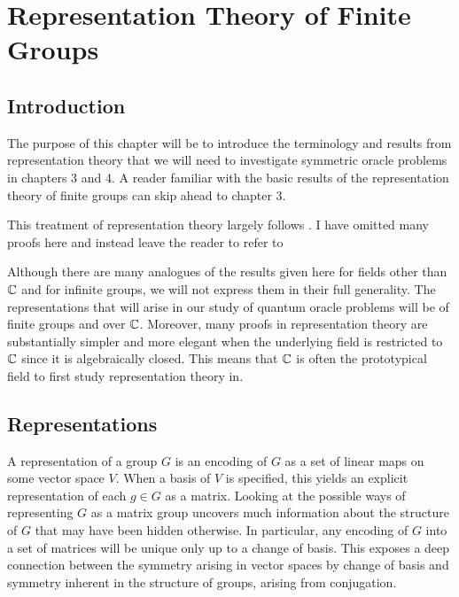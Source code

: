 
\chapter{Representation Theory of Finite Groups}

\section{Introduction}



The purpose of this chapter will be to introduce the terminology and results from representation theory that we 
will need to investigate symmetric oracle problems in chapters 3 and 4. A reader familiar with the basic results of 
the representation theory of finite groups can skip ahead to chapter 3. 

This treatment of representation theory largely follows \cite{James&Liebeck}. I have omitted many proofs here and 
instead leave the reader to refer to \cite{James&Liebeck}

Although there are many analogues of the results given here for fields other than $\mathbb{C}$ and for infinite groups, we 
will not express them in their full generality. The representations that will arise in our study of quantum oracle 
problems will be of finite groups and over $\mathbb{C}$. Moreover, many proofs in representation theory are substantially 
simpler and more elegant when the underlying field is restricted to $\mathbb{C}$ since it is algebraically closed. This 
means that $\mathbb{C}$ is often the prototypical field to first study representation theory in.

\section{Representations}

A representation of a group $G$ is an encoding of $G$ as a set of linear maps on some vector space $V$. When a 
basis of $V$ is specified, this yields an explicit representation of each $g \in G$ as a matrix. Looking at the 
possible ways of representing $G$ as a matrix group uncovers much information about the structure of $G$ that may 
have been hidden otherwise. In particular, any encoding of $G$ into a set of matrices will be unique only up to a 
change of basis. This exposes a deep connection between the symmetry arising in vector spaces by change of basis 
and symmetry inherent in the structure of groups, arising from conjugation.


